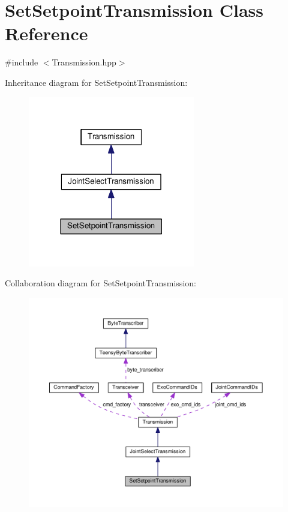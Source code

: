 \hypertarget{classSetSetpointTransmission}{}\section{Set\+Setpoint\+Transmission Class Reference}
\label{classSetSetpointTransmission}


{\ttfamily \#include $<$Transmission.\+hpp$>$}



Inheritance diagram for Set\+Setpoint\+Transmission\+:\nopagebreak
\begin{figure}[H]
\begin{center}
\leavevmode
\includegraphics[width=206pt]{classSetSetpointTransmission__inherit__graph}
\end{center}
\end{figure}


Collaboration diagram for Set\+Setpoint\+Transmission\+:
\nopagebreak
\begin{figure}[H]
\begin{center}
\leavevmode
\includegraphics[width=350pt]{classSetSetpointTransmission__coll__graph}
\end{center}
\end{figure}
